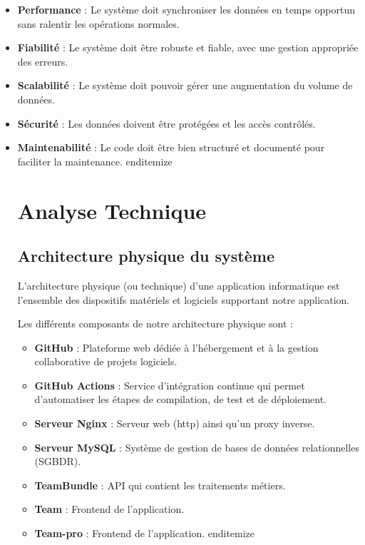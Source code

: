 \begin{enumerate}
\begin{itemize}
\begin{itemize}
    \item \textbf{Performance} : Le système doit synchroniser les données en temps opportun sans ralentir les opérations normales.
    \item \textbf{Fiabilité} : Le système doit être robuste et fiable, avec une gestion appropriée des erreurs.
    \item \textbf{Scalabilité} : Le système doit pouvoir gérer une augmentation du volume de données.
    \item \textbf{Sécurité} : Les données doivent être protégées et les accès contrôlés.
    \item \textbf{Maintenabilité} : Le code doit être bien structuré et documenté pour faciliter la maintenance.
end{itemize}

\section{Analyse Technique}

\subsection{Architecture physique du système}

L'architecture physique (ou technique) d'une application informatique est l'ensemble des dispositifs matériels et logiciels supportant notre application.

Les différents composants de notre architecture physique sont :

\begin{itemize}
    \item \textbf{GitHub} : Plateforme web dédiée à l'hébergement et à la gestion collaborative de projets logiciels.
    \item \textbf{GitHub Actions} : Service d'intégration continue qui permet d'automatiser les étapes de compilation, de test et de déploiement.
    \item \textbf{Serveur Nginx} : Serveur web (http) ainsi qu'un proxy inverse.
    \item \textbf{Serveur MySQL} : Système de gestion de bases de données relationnelles (SGBDR).
    \item \textbf{TeamBundle} : API qui contient les traitements métiers.
    \item \textbf{Team} : Frontend de l'application.
    \item \textbf{Team-pro} : Frontend de l'application.
end{itemize}


\end{itemize}
\end{itemize}
\end{itemize}
\end{enumerate}

